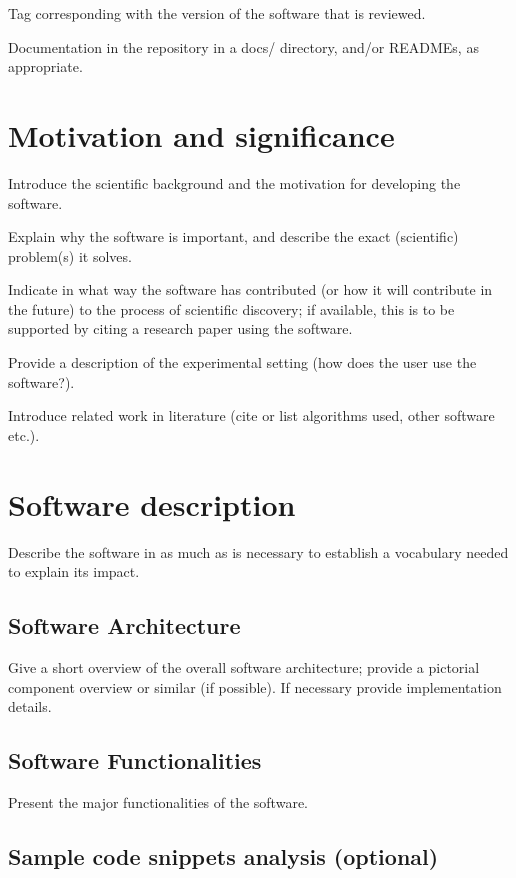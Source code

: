 \documentclass[12pt, a4paper,preprint,review]{elsarticle}
\begin{document}
Tag corresponding with the version of the software that is reviewed.

Documentation in the repository in a docs/ directory, and/or READMEs, as appropriate.




\section{Motivation and significance}
\label{}

Introduce the scientific background and the motivation for developing the software.

Explain why the software is important, and describe the exact (scientific) problem(s) it solves.

Indicate in what way the software has contributed (or how it will contribute in the future) to the process of scientific discovery; if available, this is to be supported by citing a research paper using the software.

Provide a description of the experimental setting (how does the user use the software?).

Introduce related work in literature (cite or list algorithms used, other software etc.).


\section{Software description}
\label{}

Describe the software in as much as is necessary to establish a vocabulary needed to explain its impact. 

\subsection{Software Architecture}
\label{}

Give a short overview of the overall software architecture; provide a pictorial component overview or similar (if possible). If necessary provide implementation details.

\subsection{Software Functionalities}
\label{}

Present the major functionalities of the software.

\subsection{Sample code snippets analysis (optional)}
\label{}
\end{document}
